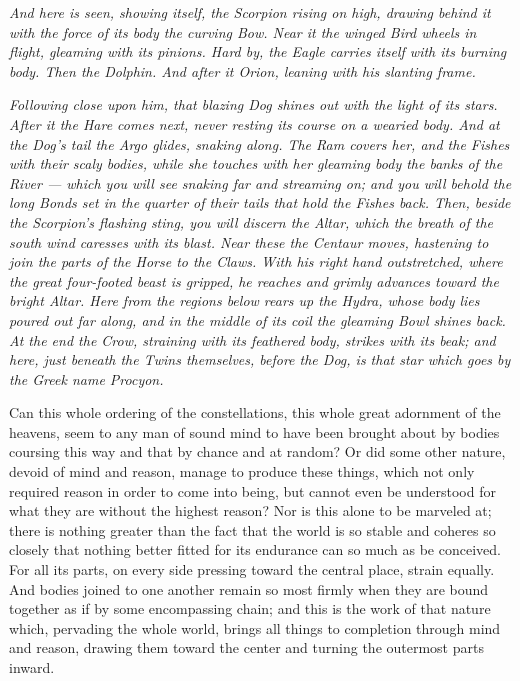  \textit{And here is seen, showing itself, the Scorpion rising on high, drawing behind it with the force of its body the curving Bow. Near it the winged Bird wheels in flight, gleaming with its pinions. Hard by, the Eagle carries itself with its burning body. Then the Dolphin. And after it Orion, leaning with his slanting frame.}

 \textit{Following close upon him, that blazing Dog shines out with the light of its stars. After it the Hare comes next, never resting its course on a wearied body. And at the Dog's tail the Argo glides, snaking along. The Ram covers her, and the Fishes with their scaly bodies, while she touches with her gleaming body the banks of the River — which you will see snaking far and streaming on; and you will behold the long Bonds set in the quarter of their tails that hold the Fishes back. Then, beside the Scorpion's flashing sting, you will discern the Altar, which the breath of the south wind caresses with its blast. Near these the Centaur moves, hastening to join the parts of the Horse to the Claws. With his right hand outstretched, where the great four-footed beast is gripped, he reaches and grimly advances toward the bright Altar. Here from the regions below rears up the Hydra, whose body lies poured out far along, and in the middle of its coil the gleaming Bowl shines back. At the end the Crow, straining with its feathered body, strikes with its beak; and here, just beneath the Twins themselves, before the Dog, is that star which goes by the Greek name Procyon.}

 Can this whole ordering of the constellations, this whole great adornment of the heavens, seem to any man of sound mind to have been brought about by bodies coursing this way and that by chance and at random? Or did some other nature, devoid of mind and reason, manage to produce these things, which not only required reason in order to come into being, but cannot even be understood for what they are without the highest reason? Nor is this alone to be marveled at; there is nothing greater than the fact that the world is so stable and coheres so closely that nothing better fitted for its endurance can so much as be conceived. For all its parts, on every side pressing toward the central place, strain equally. And bodies joined to one another remain so most firmly when they are bound together as if by some encompassing chain; and this is the work of that nature which, pervading the whole world, brings all things to completion through mind and reason, drawing them toward the center and turning the outermost parts inward.

